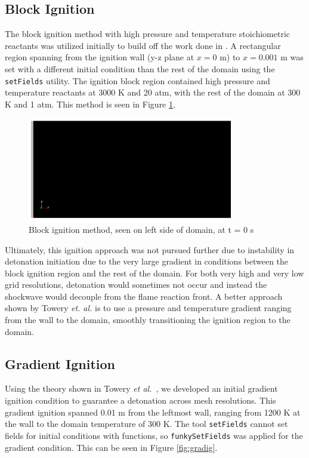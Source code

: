 \subsection{Block Ignition}

The block ignition method with high pressure and temperature stoichiometric reactants was utilized initially to build off the work done in \cite{towery1}. A rectangular region spanning from the ignition wall (y-z plane at \(x = 0\) m) to \(x = 0.001\) m was set with a different initial condition than the rest of the domain using the \verb|setFields| utility. The ignition block region contained high pressure and temperature reactants at 3000 K and 20 atm, with the rest of the domain at 300 K and 1 atm. This method is seen in Figure \ref{fig:blockig}.

\begin{figure}[t!]
\centering
\includegraphics[width=0.8\textwidth]{figs/ignition/block.png}
\caption{Block ignition method, seen on left side of domain, at t = 0 s}
\label{fig:blockig}
\end{figure}%

Ultimately, this ignition approach was not pursued further due to instability in detonation initiation due to the very large gradient in conditions between the block ignition region and the rest of the domain. For both very high and very low grid resolutions, detonation would sometimes not occur and instead the shockwave would decouple from the flame reaction front. A better approach shown by Towery \textit{et. al.} \cite{towery2} is to use a pressure and temperature gradient ranging from the wall to the domain, smoothly transitioning the ignition region to the domain. 

\subsection{Gradient Ignition}
Using the theory shown in Towery \textit{et al.}~\cite{towery2}, we developed an initial gradient ignition condition to guarantee a detonation across mesh resolutions. This gradient ignition spanned 0.01 m from the leftmost wall, ranging from 1200 K at the wall to the domain temperature of 300 K. The tool \verb|setFields| cannot set fields for initial conditions with functions, so \verb|funkySetFields| was applied for the gradient condition. This can be seen in Figure \ref{fig:gradig}. 

